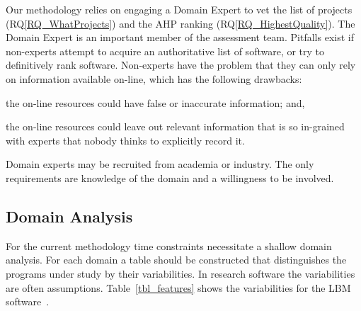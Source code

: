 \documentclass[runningheads]{llncs}
\newcommand{\rqref}[1]{RQ\ref{#1}}
\begin{document}
Our methodology relies on engaging a Domain Expert to vet the list of projects
(\rqref{RQ_WhatProjects}) and the AHP ranking (\rqref{RQ_HighestQuality}).  The
Domain Expert is an important member of the assessment
team. Pitfalls exist if non-experts attempt to acquire an authoritative list of
software, or try to definitively rank software. Non-experts have the problem
that they can only rely on information available on-line, which has the
following drawbacks:
\begin{inparaenum}[i)]
  \item the on-line resources could have false or inaccurate information; and,
  \item the on-line resources could leave out relevant information that is so
in-grained with experts that nobody thinks to explicitly record it.
\end{inparaenum}
Domain experts may be recruited from academia or industry.  The only
requirements are knowledge of the domain and a willingness to be involved.

\subsection{Domain Analysis} \label{SecDomainAnalysis}

For the current methodology time constraints necessitate a shallow domain
analysis. For each domain a table should be constructed that distinguishes the
programs under study by their variabilities.  In research software the
variabilities are often assumptions. Table~\ref{tbl_features} shows the
variabilities for the LBM software~\cite{Michalski2021}.
\end{document}
